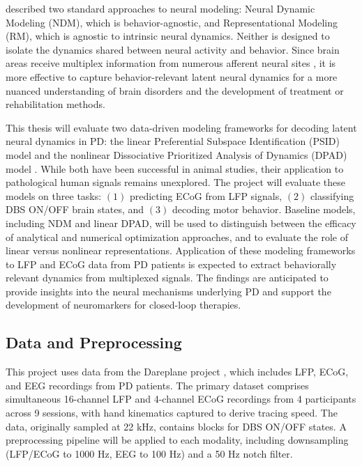 \documentclass[12pt, a4paper]{article}
\begin{document}
\textcite{saniModelingBehaviorallyRelevant2021} described two standard approaches to neural modeling: Neural Dynamic Modeling (NDM), which is behavior-agnostic, and Representational Modeling (RM), which is agnostic to intrinsic neural dynamics. Neither is designed to isolate the dynamics shared between neural activity and behavior. Since brain areas receive multiplex information from numerous afferent neural sites \parencite{wuMixedSelectivitySubthalamic2025}, it is more effective to capture behavior-relevant latent neural dynamics for a more nuanced understanding of brain disorders and the development of treatment or rehabilitation methods.

This thesis will evaluate two data-driven modeling frameworks for decoding latent neural dynamics in PD: the linear Preferential Subspace Identification (PSID) model \parencite{saniModelingBehaviorallyRelevant2021} and the nonlinear Dissociative Prioritized Analysis of Dynamics (DPAD) model \parencite{saniDissociativePrioritizedModeling2024}. While both have been successful in animal studies, their application to pathological human signals remains unexplored. The project will evaluate these models on three tasks: $(1)$ predicting ECoG from LFP signals, $(2)$ classifying DBS ON/OFF brain states, and $(3)$ decoding motor behavior. Baseline models, including NDM and linear DPAD, will be used to distinguish between the efficacy of analytical and numerical optimization approaches, and to evaluate the role of linear versus nonlinear representations. Application of these modeling frameworks to LFP and ECoG data from PD patients is expected to extract behaviorally relevant dynamics from multiplexed signals. The findings are anticipated to provide insights into the neural mechanisms underlying PD and support the development of neuromarkers for closed-loop therapies.

\subsection{Data and Preprocessing}
This project uses data from the Dareplane project \parencite{doldLFPECoGData2024}, which includes LFP, ECoG, and EEG recordings from PD patients. The primary dataset comprises simultaneous 16-channel LFP and 4-channel ECoG recordings from 4 participants across 9 sessions, with hand kinematics captured to derive tracing speed. The data, originally sampled at 22 kHz, contains blocks for DBS ON/OFF states. A preprocessing pipeline will be applied to each modality, including downsampling (LFP/ECoG to 1000 Hz, EEG to 100 Hz) and a 50 Hz notch filter.
\end{document}

